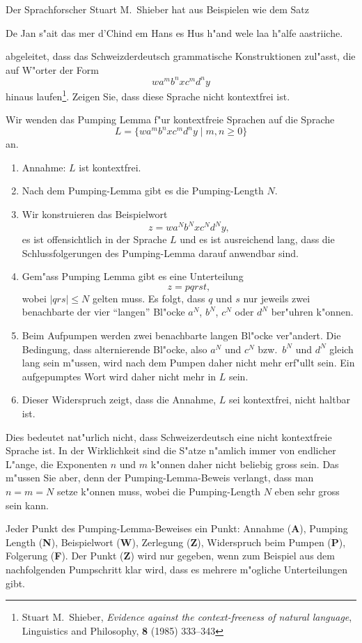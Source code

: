 Der Sprachforscher Stuart M.~Shieber hat aus Beispielen wie dem Satz
\begin{center}
De Jan s"ait das mer d'Chind em Hans es Hus h"and wele laa h"alfe aastriiche.
\end{center}
abgeleitet, dass das Schweizderdeutsch grammatische Konstruktionen
zul"asst, die auf W"orter der Form
\[
wa^mb^nxc^md^ny
\]
hinaus laufen\footnote{Stuart M.~Shieber,
{\em Evidence against the context-freeness of natural language},
Linguistics and Philosophy, {\bf 8} (1985) 333--343}.
Zeigen Sie, dass diese Sprache nicht kontextfrei ist.

\begin{loesung}
Wir wenden das Pumping Lemma f"ur kontextfreie Sprachen auf die Sprache
\[
L=\{
wa^mb^nxc^md^ny
\;|\; m,n\ge 0
\}
\]
an.
\begin{enumerate}
\item Annahme: $L$ ist kontextfrei.
\item Nach dem Pumping-Lemma gibt es die Pumping-Length $N$.
\item Wir konstruieren das Beispielwort
\[
z=wa^Nb^Nxc^Nd^Ny,
\]
es ist offensichtlich in der Sprache $L$
und es ist ausreichend lang, dass die Schlussfolgerungen des Pumping-Lemma
darauf anwendbar sind.
\item
Gem"ass Pumping Lemma gibt es eine Unterteilung
\[
z=pqrst,
\]
wobei $|qrs|\le N$ gelten muss.
Es folgt, dass $q$ und $s$ nur jeweils zwei benachbarte der
vier ``langen'' Bl"ocke $a^N$, $b^N$, $c^N$ oder $d^N$ ber"uhren k"onnen.
\item 
Beim Aufpumpen werden zwei benachbarte langen Bl"ocke ver"andert.
Die Bedingung, dass alternierende Bl"ocke, also $a^N$ und $c^N$
bzw.~$b^N$ und $d^N$ gleich lang sein m"ussen, wird nach dem Pumpen
daher nicht mehr erf"ullt sein.
Ein aufgepumptes Wort wird daher nicht mehr in $L$ sein.
\item Dieser Widerspruch zeigt, dass die Annahme, $L$ sei kontextfrei,
nicht haltbar ist.
\qedhere
\end{enumerate}
\end{loesung}

\begin{diskussion}
Dies bedeutet nat"urlich nicht, dass Schweizerdeutsch eine nicht
kontextfreie Sprache ist.
In der Wirklichkeit sind die S"atze n"amlich immer von endlicher L"ange,
die Exponenten $n$ und $m$ k"onnen daher nicht beliebig gross sein.
Das m"ussen Sie aber, denn der Pumping-Lemma-Beweis verlangt, dass man
$n=m=N$ setze k"onnen muss, wobei die Pumping-Length $N$ eben sehr gross
sein kann.
\end{diskussion}

\begin{bewertung}
Jeder Punkt des Pumping-Lemma-Beweises ein Punkt:
Annahme ({\bf A}), Pumping Length ({\bf N}), Beispielwort ({\bf W}),
Zerlegung ({\bf Z}), Widerspruch beim Pumpen ({\bf P}), 
Folgerung ({\bf F}).
Der Punkt ({\bf Z}) wird nur gegeben, wenn zum Beispiel aus dem nachfolgenden
Pumpschritt klar wird, dass es mehrere m"ogliche Unterteilungen gibt.
\end{bewertung}

